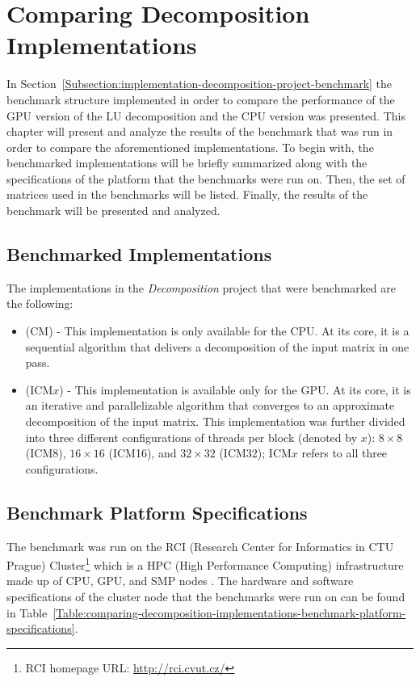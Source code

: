 \chapter{Comparing Decomposition Implementations \TO}\label{Chapter:comparing-decomposition-implementations}
In Section~\ref{Subsection:implementation-decomposition-project-benchmark} the benchmark structure implemented in order to compare the performance of the GPU version of the LU decomposition and the CPU version was presented. This chapter will present and analyze the results of the benchmark that was run in order to compare the aforementioned implementations. To begin with, the benchmarked implementations will be briefly summarized along with the specifications of the platform that the benchmarks were run on. Then, the set of matrices used in the benchmarks will be listed. Finally, the results of the benchmark will be presented and analyzed.

\section{Benchmarked Implementations \TO}\label{Section:comparing-decomposition-implementations-benchmarked-implementations}
The implementations in the \textit{Decomposition} project that were benchmarked are the following:

\begin{itemize}
	\item \textit{} (CM) - This implementation is only available for the CPU. At its core, it is a sequential algorithm that delivers a decomposition of the input matrix in one pass.
	\item \textit{} (ICM$ x $) - This implementation is available only for the GPU. At its core, it is an iterative and parallelizable algorithm that converges to an approximate decomposition of the input matrix. This implementation was further divided into three different configurations of threads per block (denoted by $ x $): $ 8\times 8 $ (ICM8), $ 16\times 16 $ (ICM16), and $ 32\times 32 $ (ICM32); ICM$ x $ refers to all three configurations.
\end{itemize}



\section{Benchmark Platform Specifications \TO}\label{Section:comparing-decomposition-implementations-benchmark-platform-specifications}
The benchmark was run on the RCI (Research Center for Informatics in CTU Prague) Cluster\footnote{RCI homepage URL: \url{http://rci.cvut.cz/}} which is a HPC (High Performance Computing) infrastructure made up of CPU, GPU, and SMP nodes \cite{VVJW5lCpZRWyg8xc}. The hardware and software specifications of the cluster node that the benchmarks were run on can be found in Table~\ref{Table:comparing-decomposition-implementations-benchmark-platform-specifications}.

